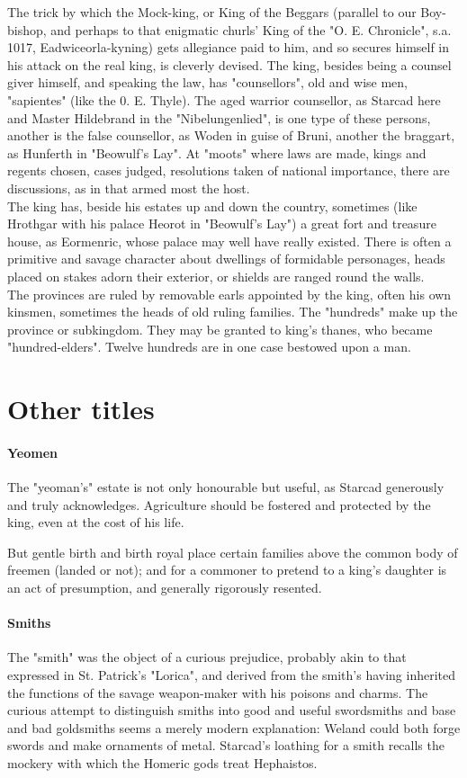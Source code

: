 \documentclass[10pt,a4paper]{report}
\begin{document}
The trick by which the Mock-king, or King of the Beggars (parallel to our Boy-bishop, and perhaps to that enigmatic churls' King of the "O. E. Chronicle", s.a. 1017, Eadwiceorla-kyning) gets allegiance paid to him, and so secures himself in his attack on the real king, is cleverly devised. The king, besides being a counsel giver himself, and speaking the law, has "counsellors", old and wise men, "sapientes" (like the 0. E. Thyle). The aged warrior counsellor, as Starcad here and Master Hildebrand in the "Nibelungenlied", is one type of these persons, another is the false counsellor, as Woden in guise of Bruni, another the braggart, as Hunferth in "Beowulf's Lay". At "moots" where laws are made, kings and regents chosen, cases judged, resolutions taken of national importance, there are discussions, as in that armed most the host.\\

The king has, beside his estates up and down the country, sometimes (like Hrothgar with his palace Heorot in "Beowulf's Lay") a great fort and treasure house, as Eormenric, whose palace may well have really existed. There is often a primitive and savage character about dwellings of formidable personages, heads placed on stakes adorn their exterior, or shields are ranged round the walls.\\

The provinces are ruled by removable earls appointed by the king, often his own kinsmen, sometimes the heads of old ruling families. The "hundreds" make up the province or subkingdom. They may be granted to king's thanes, who became "hundred-elders". Twelve hundreds are in one case bestowed upon a man.
\section{Other titles}
\paragraph*{Yeomen}
The "yeoman's" estate is not only honourable but useful, as Starcad generously and truly acknowledges. Agriculture should be fostered and protected by the king, even at the cost of his life.

But gentle birth and birth royal place certain families above the common body of freemen (landed or not); and for a commoner to pretend to a king's daughter is an act of presumption, and generally rigorously resented.

\paragraph*{Smiths}
The "smith" was the object of a curious prejudice, probably akin to that expressed in St. Patrick's "Lorica", and derived from the smith's having inherited the functions of the savage weapon-maker with his poisons and charms. The curious attempt to distinguish smiths into good and useful swordsmiths and base and bad goldsmiths seems a merely modern explanation: Weland could both forge swords and make ornaments of metal. Starcad's loathing for a smith recalls the mockery with which the Homeric gods treat Hephaistos.
\end{document}
